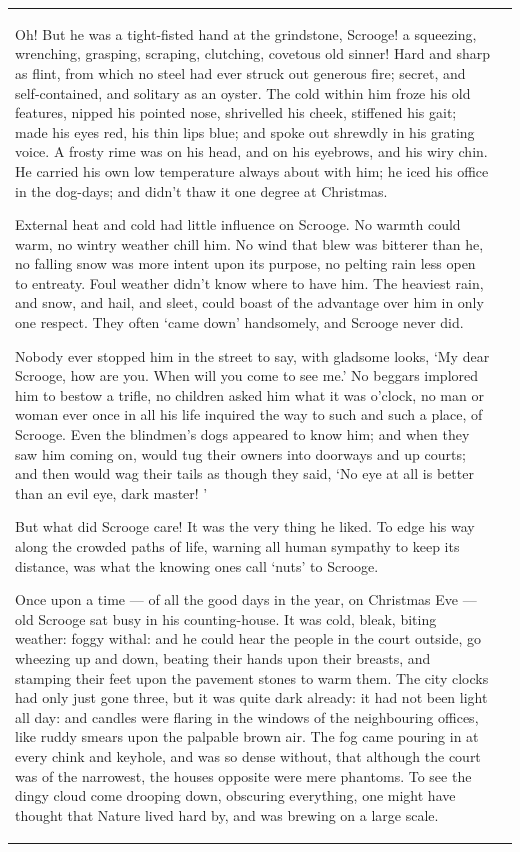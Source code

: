 \documentclass[11pt,twoside]{article}\makeatletter
\begin{document}
\begin{longtable}{P{0.19558457711442787\textwidth}P{0.6544154228855721\textwidth}}
Oh! But he was a tight-fisted hand at the grindstone, Scrooge! a squeezing, wrenching, grasping, scraping, clutching, covetous old sinner! Hard and sharp as flint, from which no steel had ever struck out generous fire; secret, and self-contained, and solitary as an oyster. The cold within him froze his old features, nipped his pointed nose, shrivelled his cheek, stiffened his gait; made his eyes red, his thin lips blue; and spoke out shrewdly in his grating voice. A frosty rime was on his head, and on his eyebrows, and his wiry chin. He  carried his own low temperature always about with him; he iced his office in the dog-days; and didn't thaw it one degree at Christmas.\par
External heat and cold had little influence on Scrooge. No warmth could warm, no wintry weather chill him. No wind that blew was bitterer than he, no falling snow was more intent upon its purpose, no pelting rain less open to entreaty. Foul weather didn't know where to have him. The heaviest rain, and snow, and hail, and sleet, could boast of the advantage over him in only one respect. They often ‘came down’ handsomely, and Scrooge never did.\par
Nobody ever stopped him in the street to say, with gladsome looks, ‘My dear Scrooge, how are you. When will you come to see me.’ No beggars implored him to bestow a trifle, no children asked him what it was o'clock, no man or woman ever once in all his life inquired the way to such and such a place, of Scrooge. Even the blindmen's dogs appeared to know him; and when they saw him coming on, would tug their owners into doorways  and up courts; and then would wag their tails as though they said, ‘No eye at all is better than an evil eye, dark master! ’\par
But what did Scrooge care! It was the very thing he liked. To edge his way along the crowded paths of life, warning all human sympathy to keep its distance, was what the knowing ones call ‘nuts’ to Scrooge.\par
Once upon a time — of all the good days in the year, on Christmas Eve — old Scrooge sat busy in his counting-house. It was cold, bleak, biting weather: foggy withal: and he could hear the people in the court outside, go wheezing up and down, beating their hands upon their breasts, and stamping their feet upon the pavement stones to warm them. The city clocks had only just gone three, but it was quite dark already: it had not been light all day: and candles were flaring in the windows of the neighbouring offices, like ruddy smears upon the palpable brown air. The fog came pouring in at every chink and keyhole, and was so dense without, that although the court was of the  narrowest, the houses opposite were mere phantoms. To see the dingy cloud come drooping down, obscuring everything, one might have thought that Nature lived hard by, and was brewing on a large scale.\par

\end{longtable}
\end{document}
